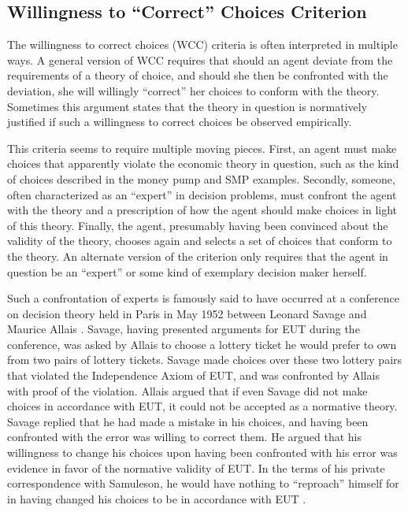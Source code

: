 \documentclass[../main.tex]{subfiles}
\begin{document}
\singlespacing
\subsection{Willingness to \enquote{Correct} Choices Criterion}
\doublespacing

The willingness to correct choices (WCC) criteria is often interpreted in multiple ways.
A general version of WCC requires that should an agent deviate from the requirements of a theory of choice, and should she then be confronted with the deviation, she will willingly \enquote{correct} her choices to conform with the theory.
Sometimes this argument states that the theory in question is normatively justified if such a willingness to correct choices be observed empirically.

This criteria seems to require multiple moving pieces.
First, an agent must make choices that apparently violate the economic theory in question, such as the kind of choices described in the money pump and SMP examples.
Secondly, someone, often characterized as an \enquote{expert} in decision problems, must confront the agent with the theory and a prescription of how the agent should make choices in light of this theory.
Finally, the agent, presumably having been convinced about the validity of the theory, chooses again and selects a set of choices that conform to the theory.
An alternate version of the criterion only requires that the agent in question be an \enquote{expert} or some kind of exemplary decision maker herself.

Such a confrontation of experts is famously said to have occurred at a conference on decision theory held in Paris in May 1952 between Leonard Savage and Maurice Allais \parencites[1]{Allais1953}[221]{Moscati2016}.
Savage, having presented arguments for EUT during the conference, was asked by Allais to choose a lottery ticket he would prefer to own from two pairs of lottery tickets.
Savage made choices over these two lottery pairs that violated the Independence Axiom of EUT, and was confronted by Allais with proof of the violation.
Allais argued that if even Savage did not make choices in accordance with EUT, it could not be accepted as a normative theory.
Savage replied that he had made a mistake in his choices, and having been confronted with the error was willing to correct them.
He argued that his willingness to change his choices upon having been confronted with his error was evidence in favor of the normative validity of EUT.
In the terms of his private correspondence with Samuleson, he would have nothing to \enquote{reproach} himself for in having changed his choices to be in accordance with EUT \parencite[230]{Moscati2016}.
\end{document}
